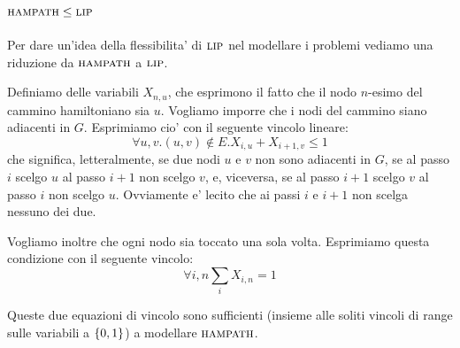 \subsection{$\textsc{hampath} \leq \textsc{lip}$}

Per dare un'idea della flessibilita' di $\textsc{lip}$ nel modellare i problemi vediamo una riduzione da
$\textsc{hampath}$ a $\textsc{lip}$.

Definiamo delle variabili $X_{n,u}$, che esprimono il fatto che il nodo $n$-esimo del cammino
hamiltoniano sia $u$. Vogliamo imporre che i nodi del cammino siano adiacenti in $G$. Esprimiamo
cio' con il seguente vincolo lineare:
\begin{equation*}
    \forall u,v.(u,v) \notin E. X_{i,u} + X_{i+1,v} \leq 1
\end{equation*}
che significa, letteralmente, se due nodi $u$ e $v$ non sono adiacenti in $G$, se al passo $i$
scelgo $u$ al passo $i+1$ non scelgo $v$, e, viceversa, se al passo $i+1$ scelgo $v$ al passo $i$
non scelgo $u$. Ovviamente e' lecito che ai passi $i$ e $i+1$ non scelga nessuno dei due.

Vogliamo inoltre che ogni nodo sia toccato una sola volta. Esprimiamo questa condizione con il
seguente vincolo:
\begin{equation*}
    \forall i,n \sum_{i}X_{i,n} = 1
\end{equation*}

Queste due equazioni di vincolo sono sufficienti (insieme alle soliti vincoli di range sulle
variabili a $\left\{0,1\right\}$) a modellare $\textsc{hampath}$.
